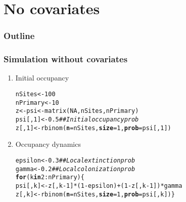 \documentclass[color=usenames,dvipsnames]{beamer}\usepackage[]{graphicx}\usepackage[]{color}
\makeatletter
\newcommand{\hlnum}[1]{\textcolor[rgb]{0.69,0.494,0}{#1}}%
\newcommand{\hlcom}[1]{\textcolor[rgb]{0.514,0.506,0.514}{\textit{#1}}}%
\newcommand{\hlopt}[1]{\textcolor[rgb]{0,0,0}{#1}}%
\newcommand{\hlstd}[1]{\textcolor[rgb]{0,0,0}{#1}}%
\newcommand{\hlkwa}[1]{\textcolor[rgb]{0,0,0}{\textbf{#1}}}%
\newcommand{\hlkwb}[1]{\textcolor[rgb]{0,0.341,0.682}{#1}}%
\newcommand{\hlkwc}[1]{\textcolor[rgb]{0,0,0}{\textbf{#1}}}%
\newcommand{\hlkwd}[1]{\textcolor[rgb]{0.004,0.004,0.506}{#1}}%
\newenvironment{kframe}{%
 \def\at@end@of@kframe{}%
 \ifinner\ifhmode%
  \def\at@end@of@kframe{\end{minipage}}%
  \begin{minipage}{\columnwidth}%
 \fi\fi%
 \def\FrameCommand##1{\hskip\@totalleftmargin \hskip-\fboxsep
 \colorbox{shadecolor}{##1}\hskip-\fboxsep
     \hskip-\linewidth \hskip-\@totalleftmargin \hskip\columnwidth}%
 \MakeFramed {\advance\hsize-\width
   \@totalleftmargin\z@ \linewidth\hsize
   \@setminipage}}%
 {\par\unskip\endMakeFramed%
 \at@end@of@kframe}
\newenvironment{knitrout}{}{} %
\makeatother
\begin{document}
\section{No covariates}


\begin{frame}
  \frametitle{Outline}
  \Large
  \tableofcontents[currentsection]
\end{frame}


\begin{frame}[fragile]
  \frametitle{Simulation without covariates}
  \small
  \vfill
  \begin{enumerate}[<+->]
    \small
  \item Initial occupancy
\begin{knitrout}\scriptsize
{}\color{fgcolor}\begin{kframe}
\begin{alltt}
\hlstd{nSites} \hlkwb{<-} \hlnum{100}
\hlstd{nPrimary} \hlkwb{<-} \hlnum{10}
\hlstd{z} \hlkwb{<-} \hlstd{psi} \hlkwb{<-} \hlkwd{matrix}\hlstd{(}\hlnum{NA}\hlstd{, nSites, nPrimary)}
\hlstd{psi[,}\hlnum{1}\hlstd{]} \hlkwb{<-} \hlnum{0.5}  \hlcom{## Initial occupancy prob}
\hlstd{z[,}\hlnum{1}\hlstd{]} \hlkwb{<-} \hlkwd{rbinom}\hlstd{(}\hlkwc{n}\hlstd{=nSites,} \hlkwc{size}\hlstd{=}\hlnum{1}\hlstd{,} \hlkwc{prob}\hlstd{=psi[,}\hlnum{1}\hlstd{])}
\end{alltt}
\end{kframe}
\end{knitrout}
  \item Occupancy dynamics
\begin{knitrout}\scriptsize
{}\color{fgcolor}\begin{kframe}
\begin{alltt}
\hlstd{epsilon} \hlkwb{<-} \hlnum{0.3} \hlcom{## Local extinction prob}
\hlstd{gamma} \hlkwb{<-} \hlnum{0.2}   \hlcom{## Local colonization prob}
\hlkwa{for}\hlstd{(k} \hlkwa{in} \hlnum{2}\hlopt{:}\hlstd{nPrimary) \{}
    \hlstd{psi[,k]} \hlkwb{<-} \hlstd{z[,k}\hlopt{-}\hlnum{1}\hlstd{]}\hlopt{*}\hlstd{(}\hlnum{1}\hlopt{-}\hlstd{epsilon)} \hlopt{+} \hlstd{(}\hlnum{1}\hlopt{-}\hlstd{z[,k}\hlopt{-}\hlnum{1}\hlstd{])}\hlopt{*}\hlstd{gamma}
    \hlstd{z[,k]} \hlkwb{<-} \hlkwd{rbinom}\hlstd{(}\hlkwc{n}\hlstd{=nSites,} \hlkwc{size}\hlstd{=}\hlnum{1}\hlstd{,} \hlkwc{prob}\hlstd{=psi[,k])    \}}
\end{alltt}
\end{kframe}
\end{knitrout}

\end{enumerate}
\end{frame}
\end{document}
